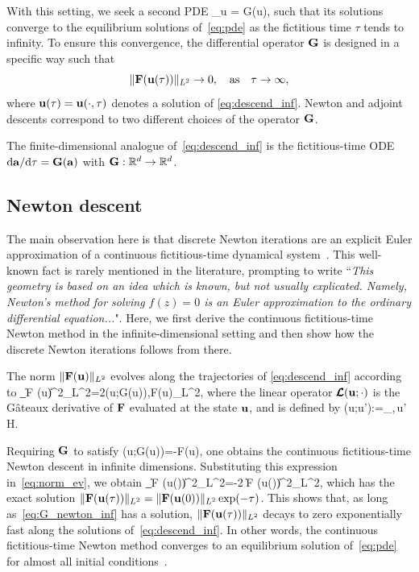 \documentclass{jfm}
\begin{document}
With this setting, we seek a second PDE
\beq
\partial_\tau\vc u = \vc G(\vc u),
\label{eq:descend_inf}
\eeq
such that its solutions
converge to the equilibrium solutions of~\eqref{eq:pde} as the fictitious
time $\tau$ tends to infinity.  To ensure this convergence, the differential operator $\mathbf G$ is
designed in a specific way such that
$$\|\mathbf F(\mathbf u(\tau))\|_{L^2}\to 0,\quad \mbox{as}\quad\tau\to\infty,$$
where $\mathbf u(\tau)= \mathbf u(\cdot, \tau)$ denotes a solution of \eqref{eq:descend_inf}.
Newton and adjoint descents correspond to two different choices of the operator
$\mathbf G$.

The finite-dimensional analogue of~\eqref{eq:descend_inf} is the fictitious-time ODE
$\mbox d\mathbf a/\mbox d\tau=\mathbf G(\mathbf a)$
with $\mathbf G:\mathbb R^d\to\mathbb R^d$.

\subsection{Newton descent}\label{sec:descend_inf}
The main observation here is that discrete Newton iterations are
an explicit Euler approximation of a continuous fictitious-time dynamical
system~\citep{saupe88}.
This well-known fact is
rarely mentioned in the literature, prompting
\cite{smale81} to write ``\textit{This geometry is based on an idea which is known,
but not usually explicated. Namely, Newton's method for
solving $f(z)=0$ is an Euler approximation to the ordinary differential equation...}".
Here, we first derive the continuous fictitious-time Newton method in the infinite-dimensional setting
and then show how the discrete Newton iterations follows from there.

The norm $\|\mathbf F
(\mathbf u)\|_{L^2}$ evolves along the trajectories of \eqref{eq:descend_inf} according to
\beq
\partial_\tau \|\vc F
(\vc u)\|^2_{L^2}=2\langle {}(\vc u;\vc G(\vc u)),\vc F(\vc u)\rangle_{L^2},
\label{eq:norm_ev}
\eeq
where the linear
operator $\pmb{\mathcal L}(\mathbf u;\cdot)$ is the G\^ateaux derivative of $\mathbf F$ evaluated
at the state $\mathbf u$, and is defined by
\beq
{}(\vc u;\vc u'):=\lim_{\epsilon{}},\quad \forall\,\vc u' \in\mathcal H.
\eeq

Requiring  $\mathbf G$ to satisfy
\beq
{}(\vc u;\vc G(\vc u))=-\vc F(\vc u),
\label{eq:G_newton_inf}
\eeq
one obtains the continuous fictitious-time Newton descent in infinite dimensions.
Substituting this expression in~\eqref{eq:norm_ev}, we obtain
\beq
\partial_\tau \|\vc F
(\vc u(\tau))\|^2_{L^2}=-2 \|\vc F
(\vc u(\tau))\|^2_{L^2},
\eeq
which has the exact solution $\|\mathbf F(\mathbf u(\tau))\|_{L^2}=\|\mathbf F(\mathbf u(0))\|_{L^2}\exp(-\tau)$.
This shows that, as long as~\eqref{eq:G_newton_inf} has
a solution, $\|\mathbf F(\mathbf u(\tau))\|_{L^2}$ decays to zero exponentially fast
along the solutions of~\eqref{eq:descend_inf}. In other words, the continuous fictitious-time
Newton method converges to an equilibrium solution of~\eqref{eq:pde} for
almost all initial conditions~\citep{saupe88,CvitLanCrete02,lanVar1}.
\end{document}
